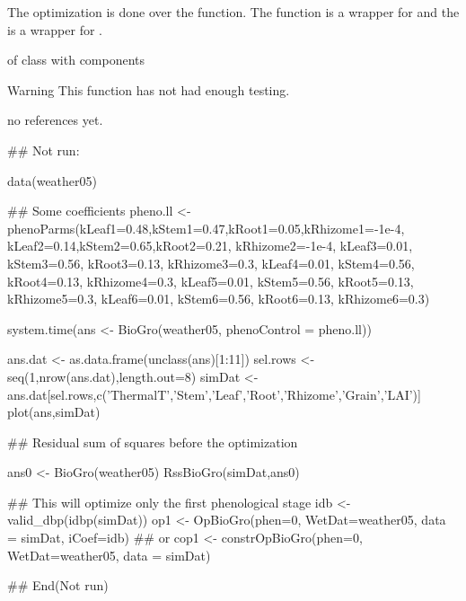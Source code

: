 \documentclass[letterpaper]{book}
\begin{document}
%
\begin{Details}\relax
The optimization is done over the 
function. The  function is a wrapper for
 and the  is a wrapper for
.
\end{Details}
%
\begin{Value}
 of class  with components
\end{Value}
%
\begin{Section}{Warning}
This function has not had enough testing.
\end{Section}
%
\begin{References}\relax
no references yet.
\end{References}
%
\begin{SeeAlso}\relax
{} 
 
\end{SeeAlso}
%
\begin{Examples}
\begin{ExampleCode}
## Not run: 

data(weather05)

## Some coefficients
pheno.ll <- phenoParms(kLeaf1=0.48,kStem1=0.47,kRoot1=0.05,kRhizome1=-1e-4,
                       kLeaf2=0.14,kStem2=0.65,kRoot2=0.21, kRhizome2=-1e-4,
                       kLeaf3=0.01, kStem3=0.56, kRoot3=0.13, kRhizome3=0.3,
                       kLeaf4=0.01, kStem4=0.56, kRoot4=0.13, kRhizome4=0.3,
                       kLeaf5=0.01, kStem5=0.56, kRoot5=0.13, kRhizome5=0.3,
                       kLeaf6=0.01, kStem6=0.56, kRoot6=0.13, kRhizome6=0.3)

system.time(ans <- BioGro(weather05, phenoControl = pheno.ll))

ans.dat <- as.data.frame(unclass(ans)[1:11])
sel.rows <- seq(1,nrow(ans.dat),length.out=8)
simDat <- ans.dat[sel.rows,c('ThermalT','Stem','Leaf','Root','Rhizome','Grain','LAI')]
plot(ans,simDat)

## Residual sum of squares before the optimization

ans0 <- BioGro(weather05)
RssBioGro(simDat,ans0)

## This will optimize only the first phenological stage
idb <- valid_dbp(idbp(simDat))
op1 <- OpBioGro(phen=0, WetDat=weather05, data = simDat, iCoef=idb)
## or
cop1 <- constrOpBioGro(phen=0, WetDat=weather05, data = simDat)


## End(Not run)
\end{ExampleCode}
\end{Examples}
\end{document}
